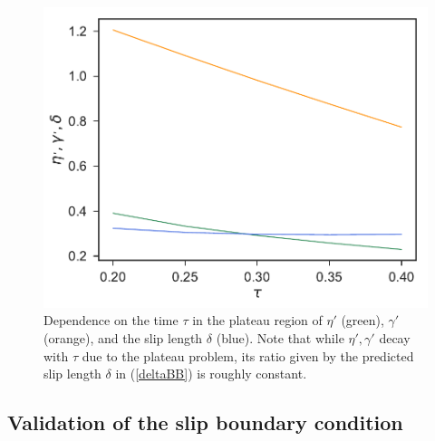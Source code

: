 \documentclass[b5paper,openright,10pt]{book}
\begin{document}
\begin{figure}[!h]
\centering
\includegraphics[scale=0.41]{tauDependenceSlip-17nodes-WALLS}
\caption[Dependence on time $\tau$ in the plateau region of $\eta'$,$\gamma'$ and the slip length $\delta$]{Dependence  on  the time  $\tau$  in  the plateau  region  of
  $\eta'$  (green),  $\gamma'$  (orange),  and the  slip  length  $\delta$
  (blue). Note  that while $\eta',\gamma'$  decay with $\tau$  due to
  the plateau  problem, its ratio  given by the predicted  slip length
  $\delta$ in (\ref{deltaBB}) is roughly constant. }
\label{Fig:tau}
\end{figure}


\subsection{Validation of the slip boundary condition}
\label{Sub:Val}
\end{document}
